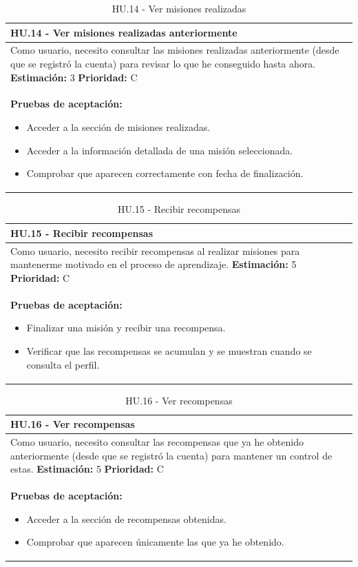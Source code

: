 \begin{table}[H]
\centering
\begin{tabularx}{\textwidth}{|X|}
\hline
\textbf{HU.14 - Ver misiones realizadas anteriormente}  \\
\hline
Como usuario, necesito consultar las misiones realizadas anteriormente (desde que se registró la cuenta) para revisar lo que he conseguido hasta ahora.
\clearpage
\textbf{Estimación: }3
\clearpage
\textbf{Prioridad: }C
\\
\hline
\textbf{Pruebas de aceptación:}
\begin{itemize}
    \item Acceder a la sección de misiones realizadas.
    \item Acceder a la información detallada de una misión seleccionada.
    \item Comprobar que aparecen correctamente con fecha de finalización.
\end{itemize}
\\
\hline
\end{tabularx}
\caption{HU.14 - Ver misiones realizadas}
\end{table}

\begin{table}[H]
\centering
\begin{tabularx}{\textwidth}{|X|}
\hline
\textbf{HU.15 - Recibir recompensas}  \\
\hline
Como usuario, necesito recibir recompensas al realizar misiones para mantenerme motivado en el proceso de aprendizaje.
\clearpage
\textbf{Estimación: }5
\clearpage
\textbf{Prioridad: }C
\\
\hline
\textbf{Pruebas de aceptación:}
\begin{itemize}
    \item Finalizar una misión y recibir una recompensa.
    \item Verificar que las recompensas se acumulan y se muestran cuando se consulta el perfil.
\end{itemize}
\\
\hline
\end{tabularx}
\caption{HU.15 - Recibir recompensas}
\end{table}

\begin{table}[H]
\centering
\begin{tabularx}{\textwidth}{|X|}
\hline
\textbf{HU.16 - Ver recompensas}  \\
\hline
Como usuario, necesito consultar las recompensas que ya he obtenido anteriormente (desde que se registró la cuenta) para mantener un control de estas.
\clearpage
\textbf{Estimación: }5
\clearpage
\textbf{Prioridad: }C
\\
\hline
\textbf{Pruebas de aceptación:}
\begin{itemize}
    \item Acceder a la sección de recompensas obtenidas.
    \item Comprobar que aparecen únicamente las que ya he obtenido.
\end{itemize}
\\
\hline
\end{tabularx}
\caption{HU.16 - Ver recompensas}
\end{table}

